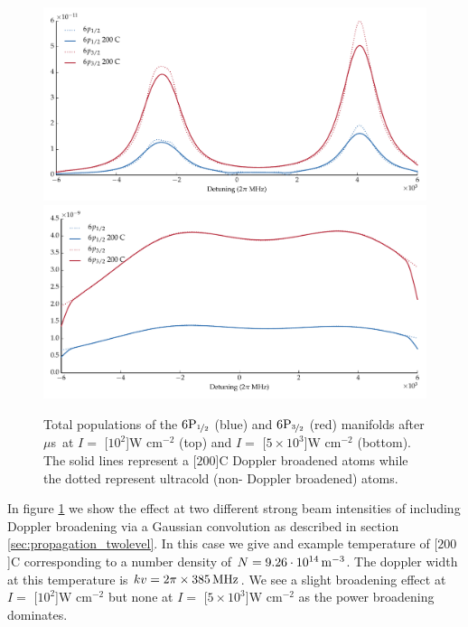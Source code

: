     \begin{figure}[h]
    \includegraphics[width=\linewidth]{figs/05_twophoton/rb87_5spd6p_hf_2_solve_scan_e02_FIXED_1e2W_fig9.pdf}
    \includegraphics[width=\linewidth]{figs/05_twophoton/rb87_5spd6p_hf_solve_scan_g02_FIXED_fig3.pdf}
    \caption{
    Total populations of the $6\rm{P}_{\nicefrac{1}{2}}$ (blue) and
    $6\rm{P}_{\nicefrac{3}{2}}$ (red) manifolds after \unit[2]{$\mu$s} at $I
    = $ \unit[$10^2$]{W cm$^{-2}$} (top) and $I = $ \unit[$5\times10^3$]{W
    cm$^{-2}$} (bottom). The solid lines represent a \unit[$200$]{\textdegree C}
    Doppler broadened atoms while the dotted represent ultracold (\ie non-
    Doppler broadened) atoms.
    }
    \label{fig:strong_6P_state_pop} 
    \end{figure}    

    In figure \ref{fig:strong_6P_state_pop} we show the effect at two different
    strong beam intensities of including Doppler broadening via a Gaussian
    convolution as described in section \ref{sec:propagation_twolevel}. In this
    case we give and example temperature of \unit[$200$]{\textdegree C}
    corresponding to a number density of $N = \unit[9.26\cdot10^{14}]{m^{-3}}$.
    The doppler width at this temperature is $kv = \unit[2\pi\times385]{MHz}$.
    We see a slight broadening effect at $I = $ \unit[$10^2$]{W cm$^{-2}$} but
    none at $I = $ \unit[$5\times10^3$]{W cm$^{-2}$} as the power broadening
    dominates.

